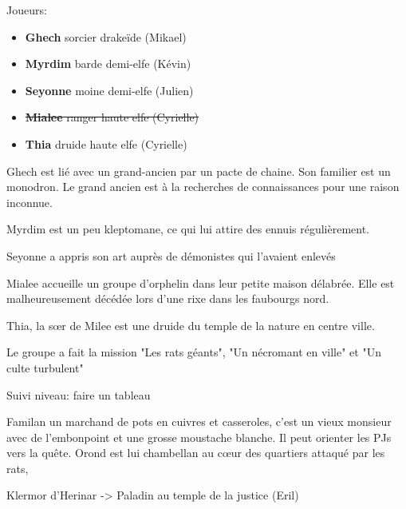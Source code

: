Joueurs:
\begin{itemize}
  \item {\bf Ghech} sorcier drakeïde (Mikael)
  \item {\bf Myrdim} barde demi-elfe (Kévin)
  \item {\bf Seyonne} moine demi-elfe (Julien)
  \item \sout{{\bf Mialee} ranger haute elfe (Cyrielle)}
  \item {\bf Thia} druide haute elfe (Cyrielle)
\end{itemize}

Ghech est lié avec un grand-ancien par un pacte de chaine. Son familier est un 
monodron. Le grand ancien est à la recherches de connaissances pour une raison
inconnue.

Myrdim est un peu kleptomane, ce qui lui attire des ennuis régulièrement.

Seyonne a appris son art auprès de démonistes qui l'avaient enlevés

Mialee accueille un groupe d'orphelin dans leur petite maison délabrée. Elle
est malheureusement décédée lors d'une rixe dans les faubourgs nord.

Thia, la s\oe{}r de Milee est une druide du temple de la nature en centre ville.

Le groupe a fait la mission "Les rats géants", "Un nécromant en ville" et "Un culte turbulent"

Suivi niveau: faire un tableau

Familan un marchand de pots en cuivres et 
casseroles, c'est un vieux monsieur avec de l'embonpoint et une grosse 
moustache blanche. Il peut orienter les PJs vers la quête.
Orond est lui chambellan au c\oe{}ur des quartiers attaqué par les rats,

Klermor d'Herinar -> Paladin au temple de la justice (Eril)


